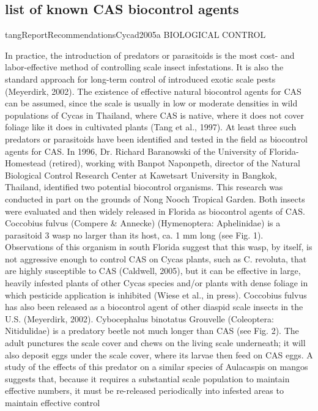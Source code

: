 \documentclass[12pt,letterpaper,english,bibliography=totocnumbered, abstract=on]{scrartcl}
\begin{document}
\begin{appendices}
\subsection{list of known CAS biocontrol agents}
\begin{displaycquote}{tangReportRecommendationsCycad2005a}
BIOLOGICAL CONTROL

In practice, the introduction of predators or parasitoids is the most cost- and labor-effective method of
controlling scale insect infestations. It is also the standard approach for long-term control of introduced
exotic scale pests (Meyerdirk, 2002). The existence of effective natural biocontrol agents for CAS can be
assumed, since the scale is usually in low or moderate densities in wild populations of Cycas in Thailand,
where CAS is native, where it does not cover foliage like it does in cultivated plants (Tang et al., 1997).
At least three such predators or parasitoids have been identified and tested in the field as biocontrol agents
for CAS.
In 1996, Dr. Richard Baranowski of the University of Florida-Homestead (retired), working with Banpot
Naponpeth, director of the Natural Biological Control Research Center at Kawetsart University in
Bangkok, Thailand, identified two potential biocontrol organisms. This research was conducted in part on
the grounds of Nong Nooch Tropical Garden. Both insects were evaluated and then widely released in
Florida as biocontrol agents of CAS.
Coccobius fulvus (Compere \& Annecke) (Hymenoptera: Aphelinidae) is a parasitoid 3 wasp no larger than its
host, ca. 1 mm long (see Fig. 1). Observations of this organism in south Florida suggest that this wasp, by itself,
is not aggressive enough to control CAS on Cycas plants, such as C. revoluta, that are highly susceptible to
CAS (Caldwell, 2005), but it can be effective in large, heavily infested plants of other Cycas species and/or
plants with dense foliage in which pesticide application is inhibited (Wiese et al., in press). Coccobius fulvus
has also been released as a biocontrol agent of other diaspid scale insects in the U.S. (Meyerdirk, 2002).
Cybocephalus binotatus Grouvelle (Coleoptera: Nitidulidae) is a predatory beetle not much longer than CAS
(see Fig. 2). The adult punctures the scale cover and chews on the living scale underneath; it will also deposit
eggs under the scale cover, where its larvae then feed on CAS eggs. A study of the effects of this predator on a
similar species of Aulacaspis on mangos suggests that, because it requires a substantial scale population to
maintain effective numbers, it must be re-released periodically into infested areas to maintain effective control

\end{displaycquote}
\end{appendices}
\end{document}
